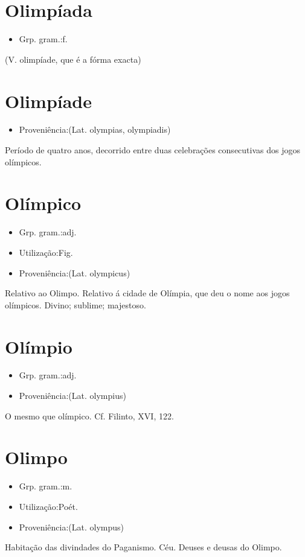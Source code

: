 \section{Olimpíada}
\begin{itemize}
\item {Grp. gram.:f.}
\end{itemize}
(V. \textunderscore olimpíade\textunderscore , que é a fórma exacta)
\section{Olimpíade}
\begin{itemize}
\item {Proveniência:(Lat. \textunderscore olympias\textunderscore , \textunderscore olympiadis\textunderscore )}
\end{itemize}
Período de quatro anos, decorrido entre duas celebrações consecutivas dos jogos olímpicos.
\section{Olímpico}
\begin{itemize}
\item {Grp. gram.:adj.}
\end{itemize}
\begin{itemize}
\item {Utilização:Fig.}
\end{itemize}
\begin{itemize}
\item {Proveniência:(Lat. \textunderscore olympicus\textunderscore )}
\end{itemize}
Relativo ao Olimpo.
Relativo á cidade de Olímpia, que deu o nome aos jogos olímpicos.
Divino; sublime; majestoso.
\section{Olímpio}
\begin{itemize}
\item {Grp. gram.:adj.}
\end{itemize}
\begin{itemize}
\item {Proveniência:(Lat. \textunderscore olympius\textunderscore )}
\end{itemize}
O mesmo que \textunderscore olímpico\textunderscore . Cf. Filinto, XVI, 122.
\section{Olimpo}
\begin{itemize}
\item {Grp. gram.:m.}
\end{itemize}
\begin{itemize}
\item {Utilização:Poét.}
\end{itemize}
\begin{itemize}
\item {Proveniência:(Lat. \textunderscore olympus\textunderscore )}
\end{itemize}
Habitação das divindades do Paganismo.
Céu.
Deuses e deusas do Olimpo.
